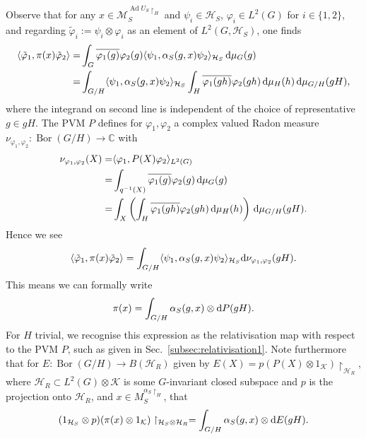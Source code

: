 \documentclass[sn-mathphys-num]{sn-jnl}%
\newcommand{\CC}{\mathbb{C}}
\newcommand{\HH}{\mathcal{H}}
\newcommand{\KK}{\mathcal{K}}
\newcommand{\MM}{\mathcal{M}}
\DeclareMathOperator{\Bor}{Bor}
\DeclareMathOperator{\Ad}{Ad}
\newcommand{\diff}{\textup{d}}
\numberwithin{equation}{section}
\theoremstyle{thmstyleone}%
\theoremstyle{thmstyletwo}%
\theoremstyle{thmstylethree}%
\begin{document}
    Observe that for any $x\in \MM_S^{\Ad U_S\restriction_H}$ and $\psi_i\in \HH_S$, $\varphi_i\in L^2(G)$ for $i\in \{1,2\}$, and regarding $\tilde{\varphi}_i:=\psi_i\otimes \varphi_i$ as an element of $ L^2(G,\HH_S)$, one finds
    \begin{align}
        \langle\tilde{\varphi}_1, \pi(x)\tilde{\varphi}_2\rangle=&\int_G\overline{\varphi_1(g)}\varphi_2(g)\langle \psi_1, \alpha_S(g,x)\psi_2\rangle_{\HH_S}\,\diff \mu_G(g)\nonumber\\
        =&\int_{G/H}\langle \psi_1, \alpha_S(g,x)\psi_2\rangle_{\HH_S}\int_H\overline{\varphi_1(gh)}\varphi_2(gh)\,\diff \mu_H(h)\,\diff \mu_{G/H}(gH),
    \end{align}
    where the integrand on second line is independent of the choice of representative $g\in gH$. The PVM $P$ defines for $\varphi_1,\varphi_2$ a complex valued Radon measure $\nu_{\varphi_1,\varphi_2}:\Bor(G/H)\to \CC$ with
    \begin{align}
    \label{eq:proj_measure}
        \nu_{\varphi_1,\varphi_2}(X)=&\langle \varphi_1,P(X)\varphi_2\rangle_{L^2(G)}\nonumber\\
        =&\int_{q^{-1}(X)}\overline{\varphi_1(g)}\varphi_2(g)\,\diff\mu_G(g)\nonumber\\
        =&\int_{X}\left(\int_{H}\overline{\varphi_1(gh)}\varphi_2(gh)\,\diff\mu_H(h)\right)\,\diff\mu_{G/H}(gH).
    \end{align}
    Hence we see
    \begin{equation}
        \label{eq:pi_matrixelt}
        \langle\tilde{\varphi}_1, \pi(x)\tilde{\varphi}_2\rangle=\int_{G/H}\langle \psi_1, \alpha_S(g,x)\psi_2\rangle_{\HH_S}\diff \nu_{\varphi_1,\varphi_2}(gH).
    \end{equation}
    This means we can formally write
    \begin{equation}
        \pi(x)=\int_{G/H}\alpha_S(g,x)\otimes\diff P(gH).
    \end{equation}
    For $H$ trivial, we recognise this expression as the relativisation map with respect to the PVM $P$, such as given in Sec.\ \ref{subsec:relativisation1}. Note furthermore that for $E:\Bor(G/H)\to B(\HH_R)$ given by $E(X)=p(P(X)\otimes 1_\KK)\restriction_{\HH_R}$, where $\HH_R\subset L^2(G)\otimes\KK$ is some $G$-invariant closed subspace and $p$ is the projection onto $\HH_R$, and $x\in M_S^{\alpha_S\restriction_H}$, that
    \begin{equation}
        (1_{\HH_S}\otimes p)(\pi(x)\otimes 1_\KK)\restriction_{\HH_S\otimes\HH_R}=\int_{G/H}\alpha_S(g,x)\otimes\diff E(gH).
    \end{equation}
\end{document}
